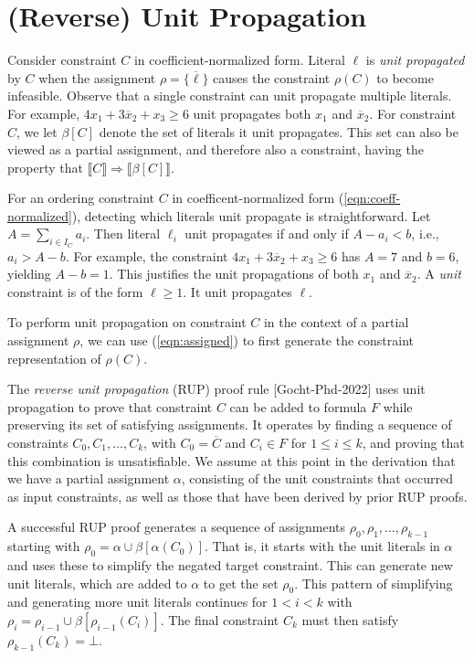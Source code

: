 \documentclass{easychair}
\newcommand{\nil}{\bot}
\renewcommand{\obar}[1]{\overline{#1}}
\newcommand{\lit}{\ell}
\newcommand{\assign}{\rho}
\newcommand{\indices}{I}
\newcommand{\uprop}[1]{\beta[#1]}
\newcommand{\imply}{\Rightarrow}
\newcommand{\func}[1]{\llbracket#1\rrbracket}
\begin{document}
\section{(Reverse) Unit Propagation}

Consider constraint $C$ in coefficient-normalized form.  Literal
$\lit$ is {\em unit propagated} by $C$ when the assignment $\assign = \{ \obar{\lit} \}$
causes the constraint $\assign(C)$ to become infeasible.
Observe that
a single constraint can unit propagate multiple literals.  For
example, $4 x_1 + 3 \obar{x}_2 + x_3 \geq 6$ unit propagates both
$x_1$ and $\obar{x}_2$.  For constraint $C$, we let $\uprop{C}$
denote the set of literals it unit propagates.  This set can also be
viewed as a partial assignment, and therefore also a constraint,
having the property that $\func{C} \imply \func{\uprop{C}}$.

For an ordering constraint $C$ in coefficent-normalized form
(\ref{eqn:coeff-normalized}), detecting which literals unit propagate
is straightforward.  Let $A = \sum_{i \in \indices_C} a_{i}$.  Then
literal $\lit_{i}$ unit propagates if and only if $A - a_{i} < b$,
i.e., $a_{i} > A - b$.  For example, the constraint $4 x_1 + 3
\obar{x}_2 + x_3 \geq 6$ has $A = 7$ and $b=6$, yielding $A-b=1$.
This justifies the unit propagations of both $x_1$ and $\obar{x}_2$.
A {\em unit} constraint is of the form $\lit \geq 1$.  It unit propagates $\lit$.

To perform unit propagation on constraint $C$ in the context of a
partial assignment $\assign$, we can use (\ref{eqn:assigned}) to first
generate the constraint representation of $\assign(C)$.

The {\em reverse unit propagation} (RUP) proof rule [Gocht-Phd-2022]
uses unit propagation to prove that constraint $C$ can be added to
formula $F$ while preserving its set of satisfying assignments.  It
operates by finding a sequence of constraints $C_0, C_1, \ldots, C_k$,
with $C_0 = \obar{C}$ and $C_i \in F$ for $1 \leq i \leq k$, and
proving that this combination is unsatisfiable.  We assume at this
point in the derivation that we have a partial assignment $\alpha$,
consisting of the unit constraints that occurred as input constraints,
as well as those that have been derived by prior RUP proofs.

A successful RUP proof generates a sequence of assignments
$\assign_0,\assign_1, \ldots, \assign_{k-1}$ starting with
$\assign_0 = \alpha \cup \uprop{\alpha(C_0)}$.
That is, it starts with the unit literals in $\alpha$ and uses these
to simplify the negated target constraint. This can generate new unit
literals, which are added to $\alpha$ to get the set $\assign_0$.
This pattern of simplifying and generating more unit literals continues for
$1 < i < k$ with $\assign_i = \assign_{i-1} \cup \uprop{\assign_{i-1}(C_i)}$.
The final constraint $C_k$
must then satisfy $\assign_{k-1}(C_k) = \nil$.
\end{document}
